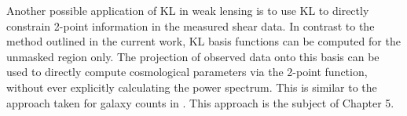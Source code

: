 Another possible application of KL in weak lensing is to use KL to 
directly constrain 2-point information in the measured shear data.  
In contrast to the method outlined in the current work, 
KL basis functions can be computed for the unmasked region only.
The projection of observed data onto this basis can be used to 
directly compute cosmological parameters via the 2-point function, 
without ever explicitly calculating the power spectrum.  
This is similar to the approach taken for galaxy counts
in \citet{Vogeley96}.  This approach is the subject of Chapter 5.
